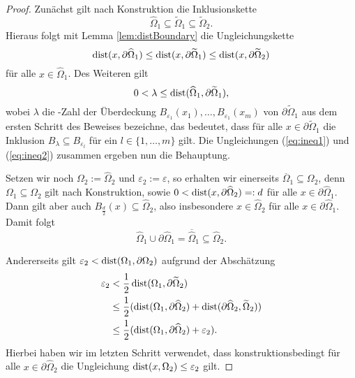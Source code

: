 \begin{proof}
  Zunächst gilt nach Konstruktion die Inklusionskette
  $$
  \widehat\Omega_1 \subseteq \widetilde\Omega_1 \subseteq \widetilde\Omega_2.
  $$
  Hieraus folgt mit Lemma \ref{lem:distBoundary} die Ungleichungskette
  \begin{equation}
    \label{eq:ineq1}
    \operatorname{dist}(x,\partial\widehat\Omega_1) 
    \leq \operatorname{dist}(x,\partial\widetilde\Omega_1) 
    \leq \operatorname{dist}(x,\partial\widetilde\Omega_2)
  \end{equation}
  für alle $x \in \widehat\Omega_1$.
  Des Weiteren gilt 
  \begin{equation}
    \label{eq:ineq2}
  0 < \lambda \leq \operatorname{dist}(\widehat\Omega_1,\partial\widetilde\Omega_1) ,
  \end{equation}
  wobei $\lambda$ die \lebesgue\hyp{}Zahl der Überdeckung $B_{\varepsilon_1}(x_1),\dots,B_{\varepsilon_1}(x_m)$ von $\partial\widetilde\Omega_1$ aus dem ersten Schritt des Beweises bezeichne, das bedeutet, dass für alle $x \in \partial\widetilde\Omega_1$ die Inklusion $B_\lambda \subseteq B_{\varepsilon_l}$ für ein $l \in \{1, \dots, m\}$ gilt.
  Die Ungleichungen (\ref{eq:ineq1}) und (\ref{eq:ineq2}) zusammen ergeben nun die Behauptung.

  Setzen wir noch $\Omega_2 := \widehat\Omega_2$ und $\varepsilon_2 := \varepsilon$, so erhalten wir einerseits $\overline\Omega_1 \subseteq \Omega_2$, denn $\Omega_1 \subseteq \Omega_2$ gilt nach Konstruktion, sowie $0 < \operatorname{dist}(x,\partial\widehat\Omega_2) =: d$ für alle $x \in \partial\widehat\Omega_1$. Dann gilt aber auch $B_{\frac{d}{2}}(x) \subseteq \widehat\Omega_2$, also insbesondere $x \in \widehat\Omega_2$ für alle $x \in \partial\widehat\Omega_1$. Damit folgt 
  $$
  \widehat\Omega_1 \cup \partial\widehat\Omega_1 = \overline{\widehat\Omega}_1 \subseteq \widehat\Omega_2.
  $$

  Andererseits gilt $\varepsilon_2 < \operatorname{dist}(\Omega_1, \partial\Omega_2)$ aufgrund der Abschätzung
  \begin{align*}
  \varepsilon_2 
  &< \frac{1}{2} \operatorname{dist}(\Omega_1, \partial\widetilde\Omega_2) \\
  & \leq \frac{1}{2} (\operatorname{dist}(\Omega_1, \partial\widehat\Omega_2) + \operatorname{dist}(\partial\widehat\Omega_2, \widetilde\Omega_2)) \\
  & \leq \frac{1}{2} (\operatorname{dist}(\Omega_1, \partial\widehat\Omega_2) + \varepsilon_2).
  \end{align*}
  Hierbei haben wir im letzten Schritt verwendet, dass konstruktionsbedingt für alle $x \in \partial \widehat\Omega_2$ die Ungleichung $\operatorname{dist}(x, \Omega_2) \leq \varepsilon_2$ gilt.


\end{proof}
